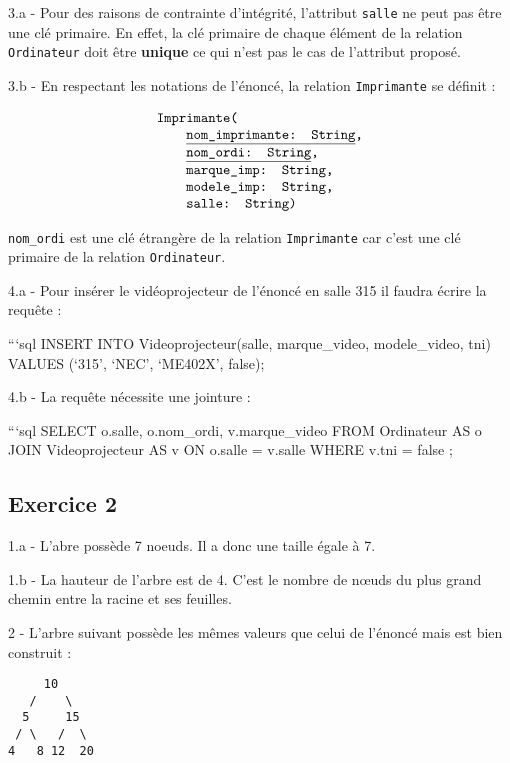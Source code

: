 \documentclass[a4paper,17pt]{extarticle}
\begin{document}
    3.a - Pour des raisons de contrainte d'intégrité, l'attribut
\texttt{salle} ne peut pas être une clé primaire. En effet, la clé
primaire de chaque élément de la relation \texttt{Ordinateur} doit être
\textbf{unique} ce qui n'est pas le cas de l'attribut proposé.

    3.b - En respectant les notations de l'énoncé, la relation
\texttt{Imprimante} se définit :

\[
\begin{array}{ll}
\texttt{Imprimante(}\\
    \texttt{\qquad\underline{nom\_imprimante: String},} \\
    \texttt{\qquad\underline{nom\_ordi: String},} \\
    \texttt{\qquad marque\_imp: String,}\\
    \texttt{\qquad modele\_imp: String,}\\
    \texttt{\qquad salle: String)}
\end{array}
\]

\texttt{nom\_ordi} est une clé étrangère de la relation
\texttt{Imprimante} car c'est une clé primaire de la relation
\texttt{Ordinateur}.

    4.a - Pour insérer le vidéoprojecteur de l'énoncé en salle 315 il faudra
écrire la requête :

```sql INSERT INTO Videoprojecteur(salle, marque\_video, modele\_video,
tni) VALUES (`315', `NEC', `ME402X', false);

    4.b - La requête nécessite une jointure :

```sql SELECT o.salle, o.nom\_ordi, v.marque\_video FROM Ordinateur AS o
JOIN Videoprojecteur AS v ON o.salle = v.salle WHERE v.tni = false ;

    \hypertarget{exercice-2}{%
\subsection{Exercice 2}\label{exercice-2}}

    1.a - L'abre possède 7 noeuds. Il a donc une taille égale à 7.

    1.b - La hauteur de l'arbre est de 4. C'est le nombre de nœuds du plus
grand chemin entre la racine et ses feuilles.

    2 - L'arbre suivant possède les mêmes valeurs que celui de l'énoncé mais
est bien construit :

\begin{verbatim}
     10
   /    \
  5     15
 / \   /  \
4   8 12  20
\end{verbatim}
\end{document}
